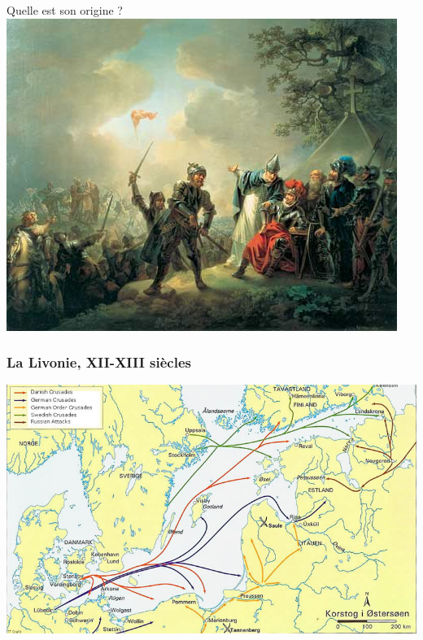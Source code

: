 \documentclass[11pt]{beamer}
\newenvironment{slide}[1]{%
\begin{frame}[environment=slide]
\frametitle{#1}
}{%
\end{frame}
}
\begin{document}
\begin{slide}{}
	Quelle est son origine ?\\ \vspace{0.2cm}
	\includegraphics[scale=2.5]{Anders_Sunesen.jpg}
\end{slide}

\begin{slide}{La Livonie, XII-XIII\up{e} siècles}
\begin{center}
\includegraphics[scale=0.37]{crusades.jpg}
\end{center}
\end{slide}
\end{document}
